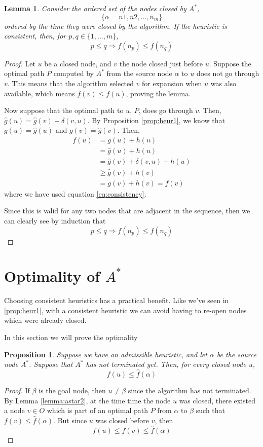 \documentclass[12pt]{report}
\newtheorem{proposition}[theorem]{Proposition}
\newtheorem{lemma}[theorem]{Lemma}
\begin{document}
\begin{lemma}
\label{lemma:heur2}
Consider the ordered set of the nodes closed by $A^*$, 
\[ \{ \alpha = n1, n2, \dots, n_m \} \]
ordered by the time they were closed by the algorithm. If the heuristic is consistent, then, for $p, q \in \{ 1, \dots, m \}$,
\[ p \leq q \Rightarrow f(n_p) \leq f(n_q) \]
\end{lemma}
\begin{proof}
Let $u$ be a closed node, and $v$ the node closed just before $u$. Suppose the optimal path $P$ computed by $A^*$ from the source node $\alpha$ to $u$ does not go through $v$. This means that the algorithm selected $v$ for expansion when $u$ was also available, which means $f(v) \leq f(u)$, proving the lemma.

Now suppose that the optimal path to $u$, $P$, does go through $v$. Then, $\hat{g}(u) = \hat{g}(v) + \delta(v, u)$. By Proposition \ref{prop:heur1}, we know that $g(u) = \hat{g}(u)$ and $g(v) = \hat{g}(v)$. Then,
\begin{align*}
f(u) &= g(u) + h(u)\\
&= \hat{g}(u) + h(u)\\
&= \hat{g}(v) + \delta(v, u) + h(u)\\
&\geq \hat{g}(v) + h(v)\\
&= g(v) + h(v) = f(v)
\end{align*}
where we have used equation \ref{eq:consistency}.

Since this is valid for any two nodes that are adjacent in the sequence, then we can clearly see by induction that
\[ p \leq q \Rightarrow f(n_p) \leq f(n_q) \]
\end{proof}

\section{Optimality of $A^*$}
Choosing consistent heuristics has a practical benefit. Like we've seen in \ref{prop:heur1}, with a consistent heuristic we can avoid having to re-open nodes which were already closed.

In this section we will prove the optimality 

\begin{proposition}
Suppose we have an admissible heuristic, and let $\alpha$ be the source node $A^*$. Suppose that $A^*$ has not terminated yet. Then, for every closed node $u$,
\[ f(u) \leq \hat{f}(\alpha) \]
\end{proposition}
\begin{proof}
If $\beta$ is the goal node, then $u \neq \beta$ since the algorithm has not terminated. By Lemma \ref{lemma:astar2}, at the time time the node $u$ was closed, there existed a node $v \in O$ which is part of an optimal path $P$ from $\alpha$ to $\beta$ such that $f(v) \leq \hat{f}(\alpha)$.
But since $u$ was closed before $v$, then
\[ f(u) \leq f(v) \leq \hat{f}(\alpha) \]
\end{proof}
\end{document}
